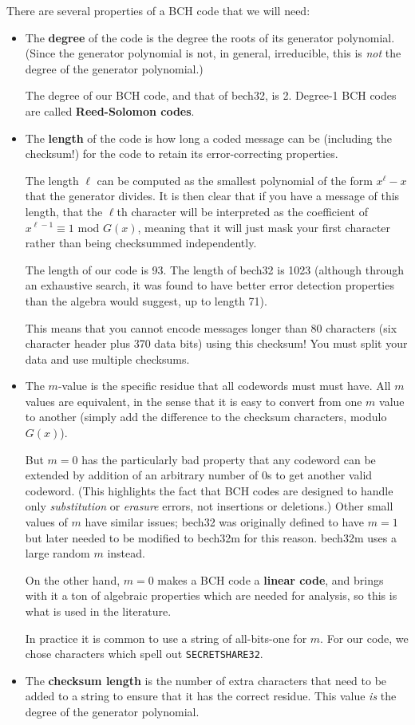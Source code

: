 \documentclass[letterpaper]{article}
\theoremstyle{xxx}
\theoremstyle{evil}
\theoremstyle{yyy}
\theoremstyle{plain}
\theoremstyle{zzz}
\newcommand{\vc}[1]{\texttt{#1}} %
\begin{document}
There are several properties of a BCH code that we will need:
\begin{itemize}
\item The \textbf{degree} of the code is the degree the roots of its
generator polynomial. (Since the generator polynomial is not, in general, irreducible,
this is \emph{not} the degree of the generator polynomial.)

The degree of our BCH code, and that of bech32, is 2. Degree-1 BCH codes are
called \textbf{Reed-Solomon codes}.

\item The \textbf{length} of the code is how long a coded message can be
(including the checksum!) for the code to retain its error-correcting
properties.

The length $\ell$ can be computed as the smallest polynomial of the form
$x^\ell - x$ that the generator divides. It is then clear that if you have a
message of this length, that the $\ell$th character will be interpreted
as the coefficient of $x^{\ell-1} \equiv 1$ mod $G(x)$, meaning that it
will just mask your first character rather than being checksummed
independently.

The length of our code is 93. The length of bech32 is 1023 (although through
an exhaustive search, it was found to have better error detection properties
than the algebra would suggest, up to length 71).

This means that you cannot encode messages longer than 80 characters (six
character header plus 370 data bits) using this checksum! You must split
your data and use multiple checksums.

\item The $m$-value is the specific residue that all codewords must 
must have. All $m$ values are equivalent, in the sense that it is easy
to convert from one $m$ value to another (simply add the difference to
the checksum characters, modulo $G(x)$).

But $m=0$ has the particularly bad property that any codeword can be extended
by addition of an arbitrary number of 0s to get another valid codeword. (This
highlights the fact that BCH codes are designed to handle only \emph{substitution}
or \emph{erasure} errors, not insertions or deletions.) Other small values of
$m$ have similar issues; bech32 was originally defined to have $m=1$ but later
needed to be modified to bech32m for this reason. bech32m uses a large random
$m$ instead.

On the other hand, $m=0$ makes a BCH code a \textbf{linear code}, and brings
with it a ton of algebraic properties which are needed for analysis, so this
is what is used in the literature.

In practice it is common to use a string of all-bits-one for $m$. For our code,
we chose characters which spell out \vc{SECRETSHARE32}.

\item The \textbf{checksum length} is the number of extra characters that
need to be added to a string to ensure that it has the correct residue.
This value \emph{is} the degree of the generator polynomial.
\end{itemize}
\end{document}

